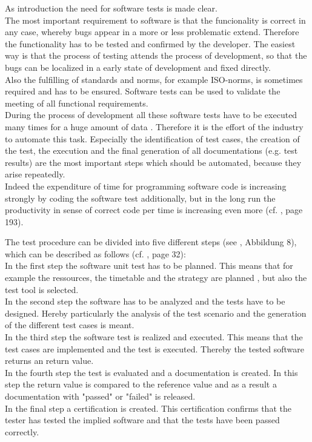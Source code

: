 As introduction the need for software tests is made clear. \\
The most important requirement to software is that the funcionality is correct in any case, whereby bugs appear in a more or less problematic extend. Therefore the functionality has to be tested and confirmed by the developer. The easiest way is that the process of testing attends the process of development, so that the bugs can be localized in a early state of development and fixed directly. \\
Also the fulfilling of standards and norms, for example ISO-norms, is sometimes required and has to be ensured. Software tests can be used to validate the meeting of all functional requirements.
\\ 
During the process of development all these software tests have to be executed many times for a huge amount of data . Therefore it is the effort of the industry to automate this task. Especially the identification of test cases, the creation of the test, the execution and the final generation of all documentations (e.g. test results) are the most important steps which should be automated, because they arise repeatedly.
\\ 
Indeed the expenditure of time for programming software code is increasing strongly by coding the software test additionally, but in the long run the productivity in sense of correct code per time is increasing even more (cf. \cite{Koeh07}, page 193).







The test procedure can be divided into five different steps (see \cite{wiki_testen}, Abbildung 8), which can be described as follows (cf. \cite{Liu13}, page 32):
\\
In the first step the software unit test has to be planned.
This means that for example the ressources, the timetable and the strategy are planned , but also the test tool is selected.
\\
In the second step the software has to be analyzed and the tests have to be designed. 
Hereby particularly the analysis of the test scenario and the generation of the different test cases is meant.
\\
In the third step the software test is realized and executed.
This means that the test cases are implemented and the test is executed. Thereby the tested software returns an return value.
\\
In the fourth step the test is evaluated and a documentation is created.
In this step the return value is compared to the reference value and as a result a documentation with "passed" or "failed" is released.
\\
In the final step a certification is created.
This certification confirms that the tester has tested the implied software and that the tests have been passed correctly.







